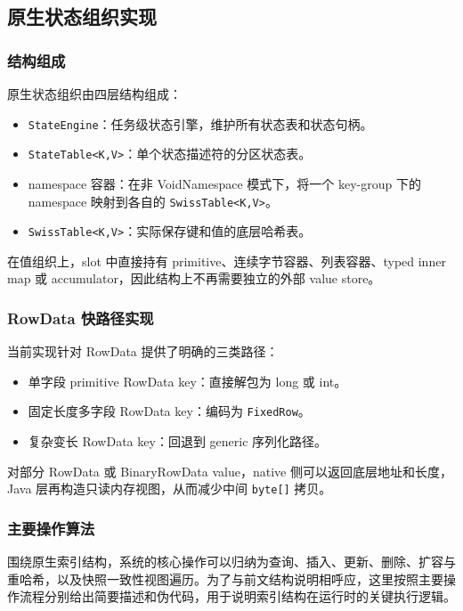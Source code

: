 \documentclass[a4paper,11pt]{article}
\begin{document}
\subsection{原生状态组织实现}

\subsubsection{结构组成}

原生状态组织由四层结构组成：

\begin{itemize}
  \item \texttt{StateEngine}：任务级状态引擎，维护所有状态表和状态句柄。
  \item \texttt{StateTable<K,V>}：单个状态描述符的分区状态表。
  \item namespace 容器：在非 VoidNamespace 模式下，将一个 key-group 下的 namespace 映射到各自的 \texttt{SwissTable<K,V>}。
  \item \texttt{SwissTable<K,V>}：实际保存键和值的底层哈希表。
\end{itemize}

在值组织上，slot 中直接持有 primitive、连续字节容器、列表容器、typed inner map 或 accumulator，因此结构上不再需要独立的外部 value store。

\subsubsection{RowData 快路径实现}

当前实现针对 RowData 提供了明确的三类路径：

\begin{itemize}
  \item 单字段 primitive RowData key：直接解包为 long 或 int。
  \item 固定长度多字段 RowData key：编码为 \texttt{FixedRow}。
  \item 复杂变长 RowData key：回退到 generic 序列化路径。
\end{itemize}

对部分 RowData 或 BinaryRowData value，native 侧可以返回底层地址和长度，Java 层再构造只读内存视图，从而减少中间 \texttt{byte[]} 拷贝。

\subsubsection{主要操作算法}

围绕原生索引结构，系统的核心操作可以归纳为查询、插入、更新、删除、扩容与重哈希，以及快照一致性视图遍历。为了与前文结构说明相呼应，这里按照主要操作流程分别给出简要描述和伪代码，用于说明索引结构在运行时的关键执行逻辑。
\end{document}
